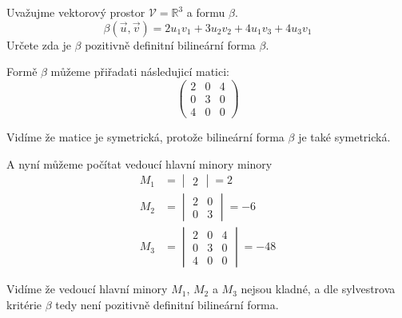 \begin{example}
    Uvažujme vektorový prostor $\mathcal{V} = \mathbb{R}^3$ a formu $\beta$.
    $$\beta(\vec{u}, \vec{v}) = 2 u_1 v_1 + 3 u_2 v_2 + 4 u_1 v_3 + 4 u_3 v_1$$
    Určete zda je $\beta$ pozitivně definitní bilineární forma $\beta$.

    Formě $\beta$ můžeme přiřadati následujicí matici:
    \[
        \begin{pmatrix}
            2 & 0 & 4\\
            0 & 3 & 0\\
            4 & 0 & 0
        \end{pmatrix}
    \]

    Vidíme že matice je symetrická, protože bilineární forma $\beta$ je také symetrická.

    A nyní můžeme počítat vedoucí hlavní minory minory
    \begin{align*}
        M_1 &= \begin{vmatrix}
            2
        \end{vmatrix} = 2\\
        M_2 &= \begin{vmatrix}
            2 & 0\\
            0 & 3
        \end{vmatrix} = -6\\
        M_3 &= \begin{vmatrix}
            2 & 0 & 4\\
            0 & 3 & 0\\
            4 & 0 & 0
        \end{vmatrix} = -48
    \end{align*}

    Vidíme že vedoucí hlavní minory $M_1$, $M_2$ a $M_3$ nejsou kladné, a dle sylvestrova kritérie
    $\beta$ tedy není pozitivně definitní bilineární forma.
\end{example}

